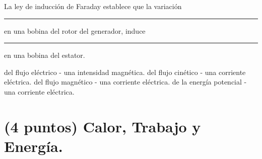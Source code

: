 \documentclass[12pt, letter]{exam}
\begin{document}
\begin{questions}
    \question La ley de inducción de Faraday establece que la variación \rule{2cm}{0.1mm} en una bobina del rotor del generador, induce \rule{2cm}{0.1mm} en una bobina del estator.
    \begin{tasks}
        \task del flujo eléctrico - una intensidad magnética.
        \task del flujo cinético - una corriente eléctrica.
        \task del flujo magnético - una corriente eléctrica.
        \task de la energía potencial - una corriente eléctrica.
    \end{tasks}

    \section{(4 puntos) Calor, Trabajo y Energía.}
    

\end{questions}
\end{document}
